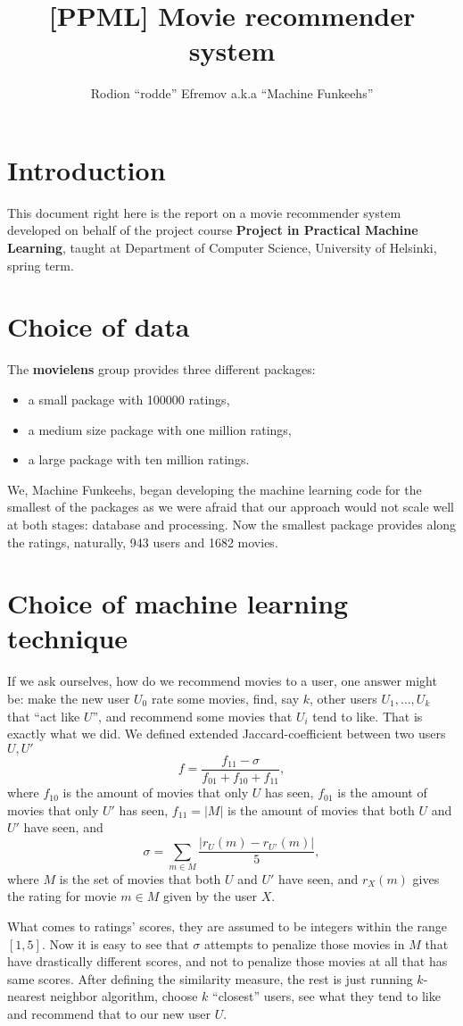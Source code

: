 \documentclass[10pt]{article}
\title{[PPML] Movie recommender system}
\author{Rodion ``rodde'' Efremov a.k.a ``Machine Funkeehs''}
\begin{document}
 \maketitle

\section{Introduction}
This document right here is the report on a movie recommender system developed on behalf of the project course \textbf{Project in Practical Machine Learning}, taught at Department of Computer Science, University of Helsinki, spring term.

\section{Choice of data}
The \textbf{movielens} group provides three different packages:
\begin{itemize}
\item a small package with 100000 ratings,
\item a medium size package with one million ratings,
\item a large package with ten million ratings.
\end{itemize}
We, Machine Funkeehs, began developing the machine learning code for the smallest of the packages as we were afraid that our approach would not scale well at both stages: database and processing. Now the smallest package provides along the ratings, naturally, 943 users and 1682 movies.

\section{Choice of machine learning technique}
If we ask ourselves, how do we recommend movies to a user, one answer might be: make the new user $U_0$ rate some movies, find, say $k$, other users $U_1, \dots, U_k$ that ``act like $U$'', and recommend some movies that $U_i$ tend to like. That is exactly what we did. We defined extended Jaccard-coefficient between two users $U, U'$
\[
f = \frac{f_{11} - \sigma}{f_{01} + f_{10} + f_{11}},
\]
where $f_{10}$ is the amount of movies that only $U$ has seen, $f_{01}$ is the amount of movies that only $U'$ has seen, $f_{11} = |M|$ is the amount of movies that both $U$ and $U'$ have seen, and
\[
\sigma = \sum_{m \in M} \frac{|r_U(m) - r_{U'}(m)|}{5},
\]
where $M$ is the set of movies that both $U$ and $U'$ have seen, and $r_X(m)$ gives the rating for movie $m \in M$ given by the user $X$.

What comes to ratings' scores, they are assumed to be integers within the range $[1, 5]$. Now it is easy to see that $\sigma$ attempts to penalize those movies in $M$ that have drastically different scores, and not to penalize those movies at all that has same scores. After defining the similarity measure, the rest is just running $k$-nearest neighbor algorithm, choose $k$ ``closest'' users, see what they tend to like and recommend that to our new user $U$. 
\end{document}
